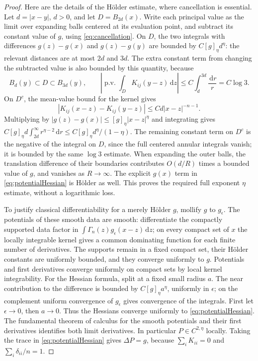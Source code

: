 \documentclass[11pt,a4paper]{article}
\numberwithin{equation}{section}
\theoremstyle{definition}
\theoremstyle{remark}
\newcommand{\dd}{\,\mathrm d}
\newcommand{\dz}{\dd z}
\newcommand{\PV}{\operatorname{p.v.}}
\begin{document}
\begin{proof}
Here are the details of the H\"older estimate, where cancellation is
essential. Let \(d=|x-y|\), \(d>0\), and let \(D=B_{2d}(x)\).
Write each principal value as the limit over expanding balls centered
at its evaluation point, and subtract its constant value of \(g\), using
\eqref{eq:cancellation}. On \(D\), the two integrals with differences
\(g(z)-g(x)\) and \(g(z)-g(y)\) are bounded by \(C[g]_\eta d^\eta\):
the relevant distances are at most \(2d\) and \(3d\). The extra constant
term from changing the subtracted value is also bounded by this quantity,
because
\[
 B_d(y)\subset D\subset B_{3d}(y),\qquad
 \left|\PV\int_D K_{ij}(y-z)\dz\right|
 \le C\int_d^{3d}\frac{\dd r}{r}=C\log3.
\]
On \(D^c\), the mean-value bound for the kernel gives
\[
 |K_{ij}(x-z)-K_{ij}(y-z)|\le Cd|x-z|^{-n-1}.
\]
Multiplying by \(|g(z)-g(x)|\le[g]_\eta|x-z|^\eta\) and integrating
gives
\(C[g]_\eta d\int_{2d}^\infty r^{\eta-2}\dd r
 \le C[g]_\eta d^\eta/(1-\eta)\).
The remaining constant term on \(D^c\) is the negative of the integral
on \(D\), since the full centered annular integrals vanish; it is bounded
by the same \(\log3\) estimate. When expanding the outer balls, the
translation difference of their boundaries contributes \(O(d/R)\)
times a bounded value of \(g\), and vanishes as \(R\to\infty\).
The explicit \(g(x)\) term in \eqref{eq:potentialHessian} is H\"older as
well. This proves the required full exponent \(\eta\) estimate, without
a logarithmic loss.

To justify classical differentiability for a merely H\"older \(g\),
mollify \(g\) to \(g_\epsilon\). The potentials of these smooth data are
smooth: differentiate the compactly supported data factor in
\(\int\Gamma_n(z)g_\epsilon(x-z)\dz\); on every compact set of \(x\)
the locally integrable kernel gives a common dominating function for each
finite number of derivatives. The supports remain in a fixed compact
set, their H\"older constants are uniformly bounded, and they converge
uniformly to \(g\). Potentials and first derivatives converge uniformly
on compact sets by local kernel integrability. For the Hessian formula,
split at a fixed small radius \(a\). The near contribution to the
difference is bounded by \(C[g]_\eta a^\eta\), uniformly in
\(\epsilon\); on the complement uniform convergence of \(g_\epsilon\)
gives convergence of the integrals. First let \(\epsilon\to0\), then
\(a\to0\). Thus the Hessians converge uniformly to
\eqref{eq:potentialHessian}. The fundamental theorem of calculus for
the smooth potentials and their first derivatives identifies both limit
derivatives. In particular \(P\in C^{2,\eta}\) locally. Taking the trace
in \eqref{eq:potentialHessian} gives \(\Delta P=g\), because
\(\sum_iK_{ii}=0\) and \(\sum_i\delta_{ii}/n=1\).


\end{proof}
\end{document}

